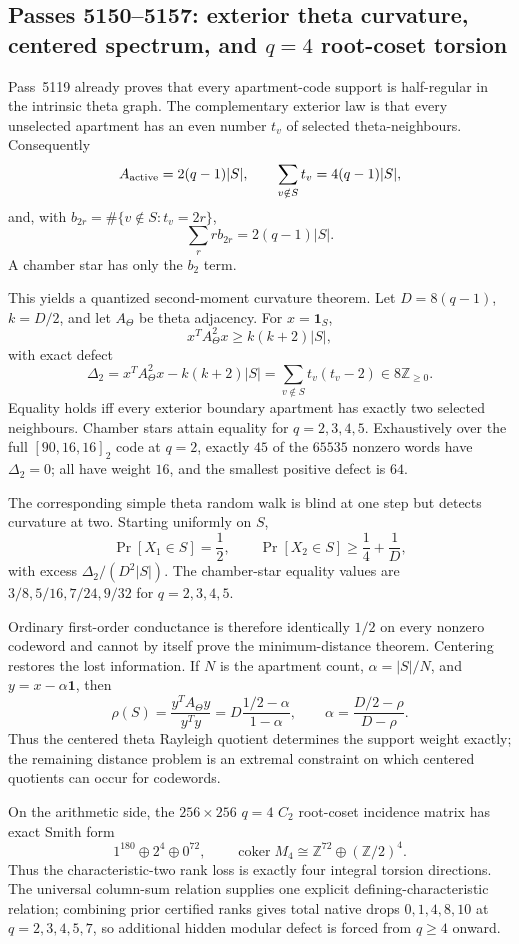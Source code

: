 \ifdefined\WPassFiveOneFiveZeroLoaded\else
\gdef\WPassFiveOneFiveZeroLoaded{1}
\subsection*{Passes 5150--5157: exterior theta curvature, centered spectrum, and $q=4$ root-coset torsion}
Pass~5119 already proves that every apartment-code support is half-regular in the intrinsic theta graph.  The complementary exterior law is that every unselected apartment has an even number $t_v$ of selected theta-neighbours.  Consequently
\[
 A_{\rm active}=2(q-1)|S|,\qquad
 \sum_{v\notin S}t_v=4(q-1)|S|,
\]
and, with $b_{2r}=\#\{v\notin S:t_v=2r\}$,
\[
 \sum_r r b_{2r}=2(q-1)|S|.
\]
A chamber star has only the $b_2$ term.

This yields a quantized second-moment curvature theorem.  Let $D=8(q-1)$, $k=D/2$, and let $A_\Theta$ be theta adjacency.  For $x=\mathbf1_S$,
\[
 x^TA_\Theta^2x\ge k(k+2)|S|,
\]
with exact defect
\[
 \Delta_2=x^TA_\Theta^2x-k(k+2)|S|
 =\sum_{v\notin S}t_v(t_v-2)\in8\mathbb Z_{\ge0}.
\]
Equality holds iff every exterior boundary apartment has exactly two selected neighbours.  Chamber stars attain equality for $q=2,3,4,5$.  Exhaustively over the full $[90,16,16]_2$ code at $q=2$, exactly $45$ of the $65535$ nonzero words have $\Delta_2=0$; all have weight $16$, and the smallest positive defect is $64$.

The corresponding simple theta random walk is blind at one step but detects curvature at two.  Starting uniformly on $S$,
\[
 \Pr[X_1\in S]=\frac12,
\qquad
 \Pr[X_2\in S]\ge\frac14+\frac1D,
\]
with excess $\Delta_2/(D^2|S|)$.  The chamber-star equality values are $3/8,5/16,7/24,9/32$ for $q=2,3,4,5$.

Ordinary first-order conductance is therefore identically $1/2$ on every nonzero codeword and cannot by itself prove the minimum-distance theorem.  Centering restores the lost information.  If $N$ is the apartment count, $\alpha=|S|/N$, and $y=x-\alpha\mathbf1$, then
\[
 \rho(S)=\frac{y^TA_\Theta y}{y^Ty}
 =D\frac{1/2-\alpha}{1-\alpha},
\qquad
 \alpha=\frac{D/2-\rho}{D-\rho}.
\]
Thus the centered theta Rayleigh quotient determines the support weight exactly; the remaining distance problem is an extremal constraint on which centered quotients can occur for codewords.

On the arithmetic side, the $256\times256$ $q=4$ $C_2$ root-coset incidence matrix has exact Smith form
\[
 1^{180}\oplus2^4\oplus0^{72},
\qquad
 \operatorname{coker}M_4\cong\mathbb Z^{72}\oplus(\mathbb Z/2)^4.
\]
Thus the characteristic-two rank loss is exactly four integral torsion directions.  The universal column-sum relation supplies one explicit defining-characteristic relation; combining prior certified ranks gives total native drops $0,1,4,8,10$ at $q=2,3,4,5,7$, so additional hidden modular defect is forced from $q\ge4$ onward.

